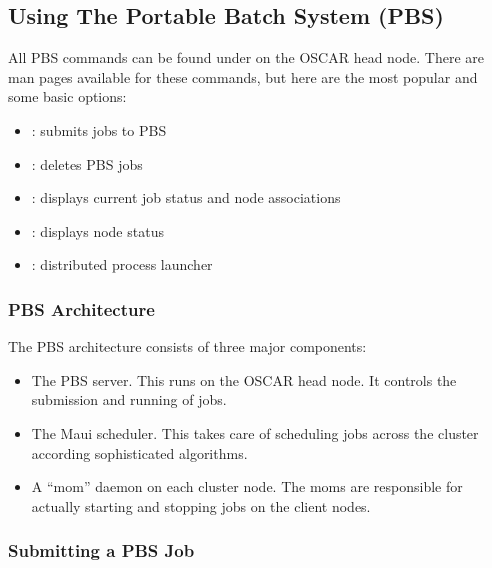 %
%
%

\subsection{Using The Portable Batch System (PBS)}
\label{app:pbs-overview}

All PBS commands can be found under  on the
OSCAR head node.  There are man pages available for these commands,
but here are the most popular and some basic options:

\begin{itemize}
\item {}: submits jobs to PBS

\item {}: deletes PBS jobs
  
\item {}: displays current job status and node
  associations

\item {}: displays node status
  
\item {}: distributed process launcher
\end{itemize}

\subsubsection{PBS Architecture}

The PBS architecture consists of three major components:

\begin{itemize}
\item The PBS server.  This runs on the OSCAR head node.  It controls
  the submission and running of jobs.
  
\item The Maui scheduler.  This takes care of scheduling jobs across
  the cluster according sophisticated algorithms.

\item A ``mom'' daemon on each cluster node.  The moms are responsible
  for actually starting and stopping jobs on the client nodes.
\end{itemize}

\subsubsection{Submitting a PBS Job}

